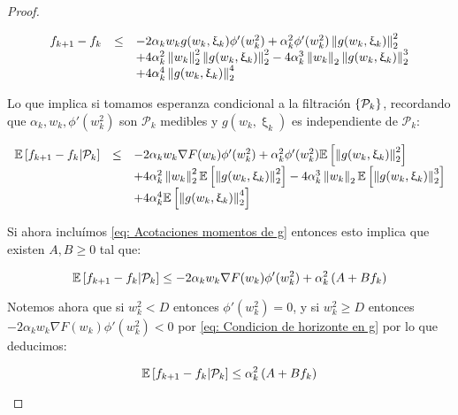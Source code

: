 \begin{proof}
\begin{enumerate}
		\begin{equation*}
		\begin{array}{rcl}
		f_{k+1} - f_k & \leq & -2 \alpha_k w_k g(w_k, \upxi_{k}) \phi'(w_k^2)  + \alpha_k^2 \phi'(w_k^2) \left\lVert g(w_k, \upxi_{k})\right\rVert_2^2 \\ 
		& & + 4 \alpha_k^2 \left\lVert w_k\right\rVert_2^2 \left\lVert g(w_k, \upxi_{k})\right\rVert_2^2 -4 \alpha_k^3 \left\lVert w_k\right\rVert_2 \left\lVert g(w_k, \upxi_{k})\right\rVert_2^3  \\
		& & + 4 \alpha_k^4 \left\lVert g(w_k, \upxi_{k})\right\rVert_2^4 \\
		\end{array}
		\end{equation*}
		
		Lo que implica si tomamos esperanza condicional a la filtraci\'on $\left\lbrace\mathcal{P}_k\right\rbrace$, recordando que $\alpha_k, w_k, \phi'(w_k^2)$ son $\mathcal{P}_k$ medibles y $g(w_k, \upxi_{k})$ es independiente de $\mathcal{P}_k$:
		
		\begin{equation*}
		\begin{array}{rcl}
		\mathbb{E} \left[{f_{k+1} - f_k} \vert \mathcal{P}_{k}\right] & \leq & -2 \alpha_k w_k \nabla F (w_k)\phi'(w_k^2)  + \alpha_k^2 \phi'(w_k^2) \mathbb{E} \left[\left\lVert g(w_k, \upxi_{k})\right\rVert_2^2\right] \\ 
		& & + 4 \alpha_k^2 \left\lVert w_k\right\rVert_2^2 \mathbb{E} \left[\left\lVert g(w_k, \upxi_{k})\right\rVert_2^2\right] -4 \alpha_k^3 \left\lVert w_k\right\rVert_2 \mathbb{E} \left[\left\lVert g(w_k, \upxi_{k})\right\rVert_2^3\right]  \\
		& & + 4 \alpha_k^4 \mathbb{E} \left[\left\lVert g(w_k, \upxi_{k})\right\rVert_2^4\right] \\
		\end{array}
		\end{equation*}
		
		
		Si ahora inclu\'imos \ref{eq: Acotaciones momentos de g} entonces esto implica que existen $A,B \geq 0$ tal que:
		
		\begin{equation*}
		\mathbb{E} \left[{f_{k+1} - f_k} \vert \mathcal{P}_{k}\right] \leq -2 \alpha_k w_k \nabla F (w_k)\phi'(w_k^2)  + \alpha_k^2\left(A + B f_k\right)
		\end{equation*}
		
		Notemos ahora que si $w_k^2 < D$ entonces $\phi'(w_k^2) = 0$, y si $w_k^2 \geq D$ entonces $-2 \alpha_k w_k \nabla F (w_k)\phi'(w_k^2) < 0$ por \ref{eq: Condicion de horizonte en g} por lo que deducimos:
		
		\begin{equation}
		\mathbb{E} \left[{f_{k+1} - f_k} \vert \mathcal{P}_{k}\right] \leq \alpha_k^2\left(A + B f_k\right)
		\end{equation}	
		

\end{enumerate}
\end{proof}

